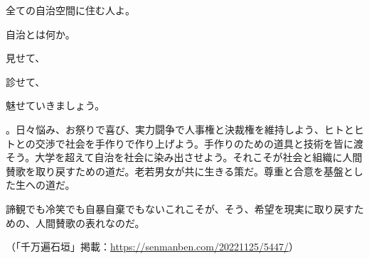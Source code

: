 \begin{center}

\end{center}

{\Large
  全ての自治空間に住む人よ。

  自治とは何か。

  見せて、

  診せて、

  魅せていきましょう。
}
 	
。日々悩み、お祭りで喜び、実力闘争で人事権と決裁権を維持しよう、ヒトとヒトとの交渉で社会を手作りで作り上げよう。手作りのための道具と技術を皆に渡そう。大学を超えて自治を社会に染み出させよう。それこそが社会と組織に人間賛歌を取り戻すための道だ。老若男女が共に生きる策だ。尊重と合意を基盤とした生への道だ。

諦観でも冷笑でも自暴自棄でもないこれこそが、そう、希望を現実に取り戻すための、人間賛歌の表れなのだ。





（「千万遍石垣」掲載：\url{https://senmanben.com/20221125/5447/}）
